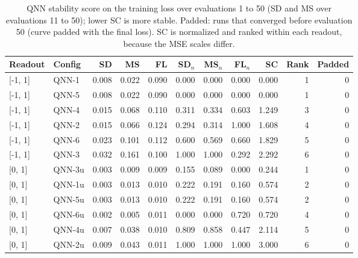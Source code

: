 \begin{table}[htbp]
\centering
\small
\caption{QNN stability score on the training loss over evaluations 1 to 50 (SD and MS over evaluations 11 to 50); lower SC is more stable. Padded: runs that converged before evaluation 50 (curve padded with the final loss). SC is normalized and ranked within each readout, because the MSE scales differ.}
\label{tab:t4}
\begin{tabular}{llrrrrrrrrr}
\toprule
Readout & Config & SD & MS & FL & SD$_n$ & MS$_n$ & FL$_n$ & SC & Rank & Padded \\
\midrule
{[-1, 1]} & QNN-1 & 0.008 & 0.022 & 0.090 & 0.000 & 0.000 & 0.000 & 0.000 & 1 & 0 \\
{[-1, 1]} & QNN-5 & 0.008 & 0.022 & 0.090 & 0.000 & 0.000 & 0.000 & 0.000 & 1 & 0 \\
{[-1, 1]} & QNN-4 & 0.015 & 0.068 & 0.110 & 0.311 & 0.334 & 0.603 & 1.249 & 3 & 0 \\
{[-1, 1]} & QNN-2 & 0.015 & 0.066 & 0.124 & 0.294 & 0.314 & 1.000 & 1.608 & 4 & 0 \\
{[-1, 1]} & QNN-6 & 0.023 & 0.101 & 0.112 & 0.600 & 0.569 & 0.660 & 1.829 & 5 & 0 \\
{[-1, 1]} & QNN-3 & 0.032 & 0.161 & 0.100 & 1.000 & 1.000 & 0.292 & 2.292 & 6 & 0 \\
\midrule
{[0, 1]} & QNN-3u & 0.003 & 0.009 & 0.009 & 0.155 & 0.089 & 0.000 & 0.244 & 1 & 0 \\
{[0, 1]} & QNN-1u & 0.003 & 0.013 & 0.010 & 0.222 & 0.191 & 0.160 & 0.574 & 2 & 0 \\
{[0, 1]} & QNN-5u & 0.003 & 0.013 & 0.010 & 0.222 & 0.191 & 0.160 & 0.574 & 2 & 0 \\
{[0, 1]} & QNN-6u & 0.002 & 0.005 & 0.011 & 0.000 & 0.000 & 0.720 & 0.720 & 4 & 0 \\
{[0, 1]} & QNN-4u & 0.007 & 0.038 & 0.010 & 0.809 & 0.858 & 0.447 & 2.114 & 5 & 0 \\
{[0, 1]} & QNN-2u & 0.009 & 0.043 & 0.011 & 1.000 & 1.000 & 1.000 & 3.000 & 6 & 0 \\
\bottomrule
\end{tabular}
\par{}
\end{table}
